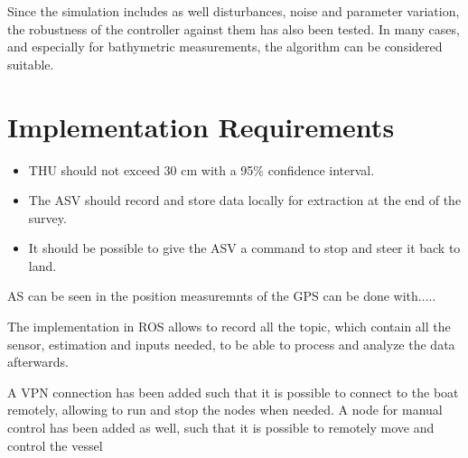 Since the simulation includes as well disturbances, noise and parameter variation, the robustness of the controller against them has also been tested. In many cases, and especially for bathymetric measurements, the algorithm can be considered suitable.


\section{Implementation Requirements}
\begin{itemize}
    \item THU should not exceed 30 cm with a 95\% confidence interval.
    \item The ASV should record and store data locally for extraction at the end of the survey.
    \item It should be possible to give the ASV a command to stop and steer it back to land.
\end{itemize}

AS can be seen in  the position measuremnts of the GPS can be done with.....

The implementation in ROS allows to record all the topic, which contain all the sensor, estimation and inputs needed, to be able to process and analyze the data afterwards.

A VPN connection has been added such that it is possible to connect to the boat remotely, allowing to run and stop the nodes when needed. A node for manual control has been added as well, such that it is possible to remotely move and control the vessel

